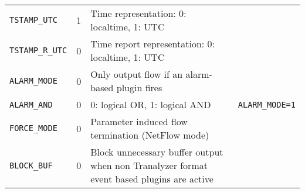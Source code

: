 \begin{center}
\begin{tabularx}{\textwidth}{lcXl}
        {\tt TSTAMP\_UTC}       & 1   & Time representation: 0: localtime, 1: UTC\\
        {\tt TSTAMP\_R\_UTC}    & 0   & Time report representation: 0: localtime, 1: UTC\\
        {\tt ALARM\_MODE}       & 0   & Only output flow if an alarm-based plugin fires\\
        {\tt ALARM\_AND}        & 0   & 0: logical OR, 1: logical AND & {\tt ALARM\_MODE=1}\\
        {\tt FORCE\_MODE}       & 0   & Parameter induced flow termination (NetFlow mode)\\
        {\tt BLOCK\_BUF}        & 0   & Block unnecessary buffer output when non Tranalyzer format event based plugins are active\\
        \bottomrule
    \end{tabularx}
\end{center}
